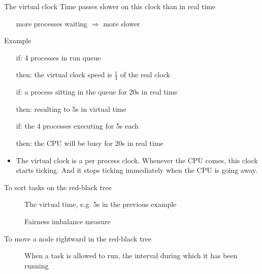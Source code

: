 \begin{frame}{The virtual clock}
  Time passes slower on this clock than in real time
  \begin{itemize}
  \item[] more processes waiting $\Rightarrow$ more slower
  \end{itemize}
  \begin{block}{Example}
    \begin{itemize}
    \item[if:] 4 processes in run queue
    \item[then:] the virtual clock speed is $\frac{1}{4}$ of the real clock
    \item[if:] a process sitting in the queue for 20s in real time
    \item[then:] resulting to 5s in virtual time
    \item[if:] the 4 processes executing for 5s each
    \item[then:] the CPU will be busy for 20s in real time
    \end{itemize}
  \end{block}
\end{frame}

\begin{itemize}
\item The virtual clock is a per process clock. Whenever the CPU comes, this
  clock starts ticking. And it stops ticking immediately when the CPU is going away.
\end{itemize}

\begin{frame}
  \begin{block}{To sort tasks on the red-black tree}
    \begin{center}
    \end{center}
    \begin{description}
    \item[] The virtual time, e.g. 5s in the previous example
    \item[] Fairness imbalance measure 
    \end{description}
  \end{block}
  \begin{block}{To move a node rightward in the red-black tree}
    \begin{center}
    \end{center}
    \begin{description}
    \item[] When a task is allowed to run, the interval during which
      it has been running
    \end{description}
  \end{block}
\end{frame}


